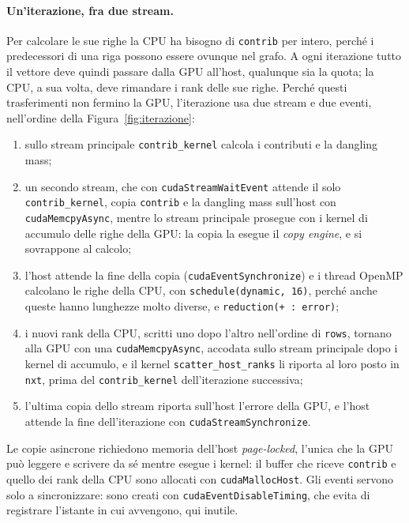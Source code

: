 \documentclass[11pt,a4paper]{article}
\begin{document}
\paragraph{Un'iterazione, fra due stream.}
Per calcolare le sue righe la CPU ha bisogno di \texttt{contrib} per
intero, perché i predecessori di una riga possono essere ovunque nel grafo. A
ogni iterazione tutto il vettore deve quindi passare dalla GPU all'host, 
qualunque sia la quota; la CPU, a sua volta, deve
rimandare i rank delle sue righe. Perché questi trasferimenti non fermino la
GPU, l'iterazione usa due stream e due eventi,
nell'ordine della Figura~\ref{fig:iterazione}:
\begin{enumerate}\itemsep2pt
  \item sullo stream principale \texttt{contrib\_kernel} calcola i
    contributi e la dangling mass;
  \item un secondo stream, che con \texttt{cudaStreamWaitEvent} attende
    il solo \texttt{contrib\_kernel}, copia \texttt{contrib} e la dangling mass
    sull'host con \texttt{cudaMemcpyAsync}, mentre lo stream principale
    prosegue con i kernel di accumulo delle righe della GPU: la copia la esegue
    il \emph{copy engine}, e si sovrappone al calcolo;
  \item l'host attende la fine della copia
    (\texttt{cudaEventSynchronize}) e i thread OpenMP calcolano le righe della
    CPU, con \texttt{schedule(dynamic,~16)}, perché anche queste hanno
    lunghezze molto diverse, e \texttt{reduction(+~:~error)};
  \item i nuovi rank della CPU, scritti uno dopo l'altro nell'ordine di
    \texttt{rows}, tornano alla GPU con una \texttt{cudaMemcpyAsync},
    accodata sullo stream principale dopo i kernel di accumulo, e il kernel
    \texttt{scatter\_host\_ranks} li riporta al loro posto in \texttt{nxt},
    prima del \texttt{contrib\_kernel} dell'iterazione successiva;
  \item l'ultima copia dello stream riporta sull'host l'errore della
    GPU, e l'host attende la fine dell'iterazione con
    \texttt{cudaStreamSynchronize}.
\end{enumerate}
Le copie asincrone richiedono memoria dell'host \emph{page-locked},
l'unica che la GPU può leggere e scrivere da sé mentre esegue i kernel: il
buffer che riceve \texttt{contrib} e quello dei rank della CPU sono allocati
con \texttt{cudaMallocHost}. Gli eventi servono solo a
sincronizzare: sono creati con \texttt{cudaEventDisableTiming}, che evita di
registrare l'istante in cui avvengono, qui inutile.
\end{document}
